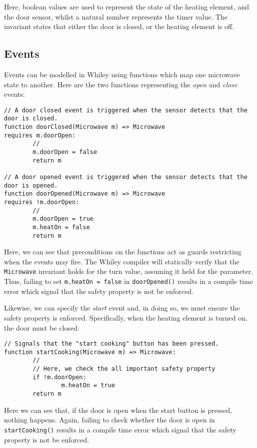 Here, boolean values are used to represent the state of the heating element, and the door sensor, whilst a natural number represents the timer value.  The invariant states that either the door is closed, or the heating element is off.

\subsection{Events}

Events can be modelled in Whiley using functions which map one microwave state to another.  Here are the two functions representing the {\em open} and {\em close} events:
\begin{lstlisting}
// A door closed event is triggered when the sensor detects that the door is closed.
function doorClosed(Microwave m) => Microwave
requires m.doorOpen:
        //
        m.doorOpen = false
        return m

// A door opened event is triggered when the sensor detects that the door is opened.
function doorOpened(Microwave m) => Microwave
requires !m.doorOpen:
        //
        m.doorOpen = true
        m.heatOn = false
        return m
\end{lstlisting}

Here, we can see that preconditions on the functions act as guards restricting when the events may fire.  The Whiley compiler will statically verify that the \lstinline{Microwave} invariant holds for the turn value, assuming it held for the parameter.  Thus, failing to set \lstinline{m.heatOn = false} in \lstinline{doorOpened()} results in a compile time error which signal that the safety property is not be enforced.

Likewise, we can specify the {\em start} event and, in doing so, we must ensure the safety property is enforced.  Specifically, when the heating element is turned on, the door must be closed:

\begin{lstlisting}
// Signals that the "start cooking" button has been pressed. 
function startCooking(Microwave m) => Microwave:
        //        
        // Here, we check the all important safety property
        if !m.doorOpen:
                m.heatOn = true
        return m
\end{lstlisting}

Here we can see that, if the door is open when the start button is pressed, nothing happens.  Again, failing to check whether the door is open in \lstinline{startCooking()} results in a compile time error which signal that the safety property is not be enforced.
